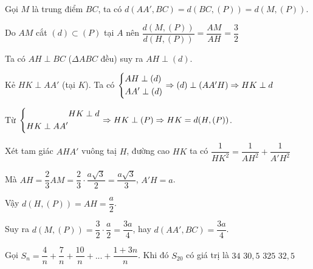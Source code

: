 \begin{ex}
{		Gọi $M$ là trung điểm $BC$, ta có  $d(AA',BC) = d(BC, (P)) = d(M, (P))$.
		
		Do $AM$ cắt $(d) \subset (P)$ tại $A$ nên $\dfrac{d(M,(P))}{d(H,(P))} = \dfrac{AM}{AH} = \dfrac{3}{2}$ 
		
		Ta có $AH \perp BC$ ($\Delta ABC$ đều) suy ra $AH \perp (d)$.
		
		Kẻ $HK \perp AA'$ (tại $K$). Ta có $\left\{\begin{aligned}&AH \perp (d)\\&AA' \perp (d)\end{aligned}\right. \Rightarrow (d) \perp (AA'H) \Rightarrow HK \perp d$
		
		Từ $\left\{\begin{aligned}&HK \perp d \\ HK \perp AA'\end{aligned}\right. \Rightarrow HK \perp (P) \Rightarrow HK = d(H, (P))$.
		
		Xét tam giác $AHA'$ vuông taị $H$, đường cao $HK$ ta có $\dfrac{1}{HK^2} = \dfrac{1}{AH^2} + \dfrac{1}{A'H^2}$
		
		Mà $AH = \dfrac{2}{3} AM = \dfrac{2}{3} \cdot \dfrac{a\sqrt{3}}{2} = \dfrac{a\sqrt{3}}{3}$, $A'H = a$.
		
		Vậy $d(H,(P)) = AH = \dfrac{a}{2}$.
		
		Suy ra $d(M,(P)) = \dfrac{3}{2} \cdot \dfrac{a}{2} = \dfrac{3a}{4}$, hay $d(AA',BC) = \dfrac{3a}{4}$.
		
		
	}
\end{ex}


\begin{ex}%
	Gọi $S_n = \dfrac{4}{n} + \dfrac{7}{n} + \dfrac{10}{n} + ... + \dfrac{1+3n}{n}$. Khi đó $S_{20}$ có giá trị là
	\choice
	{$34$}
	{$30,5$}
	{$325$}
	{\True $32,5$}
\end{ex}

